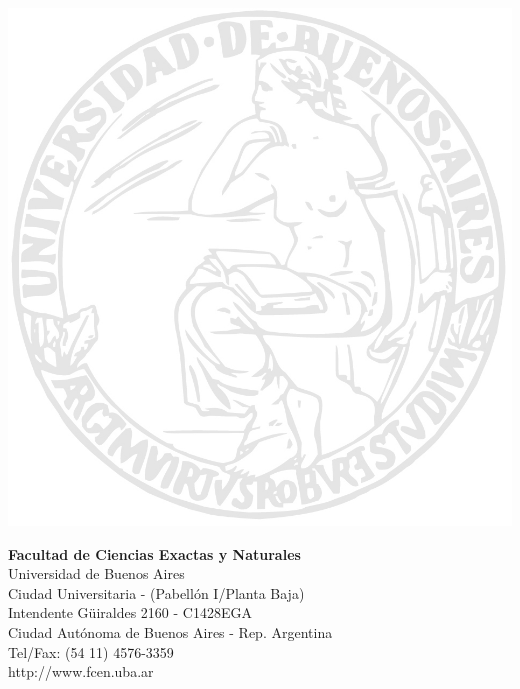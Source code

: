 {\begin{center}
        \tablaEntregas
    \end{center}%
    \vfill%
%
    \begin{minipage}[t]{\textwidth}
        \begin{minipage}[t]{.55 \textwidth}
            \includegraphics{logo_uba.jpg}
        \end{minipage}%
        \begin{minipage}[b]{.45 \textwidth}
            \textbf{\textsf{Facultad de Ciencias Exactas y Naturales}} \\
            \textsf{Universidad de Buenos Aires} \\
            {\scriptsize %
            Ciudad Universitaria - (Pabell\'on I/Planta Baja) \\
                Intendente G\"uiraldes 2160 - C1428EGA \\
            Ciudad Aut\'onoma de Buenos Aires - Rep. Argentina \\
                Tel/Fax: (54 11) 4576-3359 \\
            http://www.fcen.uba.ar \\
            }
        \end{minipage}
    \end{minipage}%
%
    \newpage\aftermaketitle}

